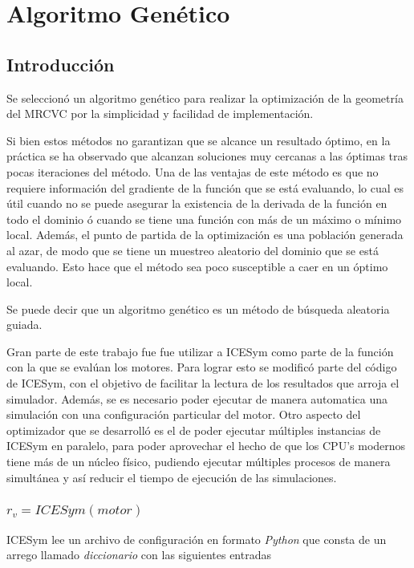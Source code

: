 \chapter{Algoritmo Genético}

\section{Introducción}
%
Se seleccionó un algoritmo genético para realizar la optimización de la
geometría del MRCVC por la simplicidad y facilidad de implementación.
%

Si bien estos métodos no garantizan que se alcance un resultado óptimo, en la
práctica\cite{goldberg}\cite{shi} se ha observado que alcanzan soluciones muy
cercanas a las óptimas tras pocas iteraciones del método.
%
Una de las ventajas de este método es que no requiere información del gradiente
de la función que se está evaluando, lo cual es útil cuando no se puede
asegurar la existencia de la derivada de la función en todo el dominio ó cuando
se tiene una función con más de un máximo o mínimo local.
%
Además, el punto de partida de la optimización es una población generada al
azar, de modo que se tiene un muestreo aleatorio del dominio que se está
evaluando.
%
Esto hace que el método sea poco susceptible a caer en un óptimo local.

Se puede decir que un algoritmo genético es un método de búsqueda aleatoria
guiada.
%

Gran parte de este trabajo fue fue utilizar a ICESym como parte de la función
con la que se evalúan los motores.
%
Para lograr esto se modificó parte del código de ICESym, con el objetivo de
facilitar la lectura de los resultados que arroja el simulador.
%
Además, se es necesario poder ejecutar de manera automatica una simulación con
una configuración particular del motor.
%
Otro aspecto del optimizador que se desarrolló es el de poder ejecutar
múltiples instancias de ICESym en paralelo, para poder aprovechar el hecho de
que los CPU's modernos tiene más de un núcleo físico, pudiendo ejecutar
múltiples procesos de manera simultánea y así reducir el tiempo de ejecución de
las simulaciones. 
%

\subsection{$r_v = ICESym(motor)$}
%
ICESym lee un archivo de configuración en formato \emph{Python} que consta de
un arrego llamado \emph{diccionario} con las siguientes entradas

